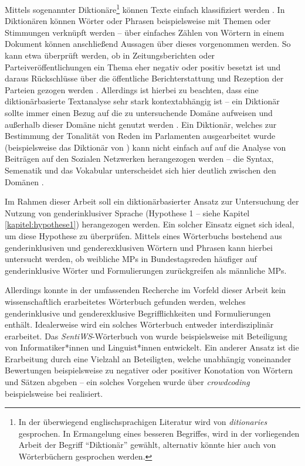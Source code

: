 \documentclass[12pt, 
    twoside=false, 
    bibliography=totoc, 
    numbers=endperiod, 
    headings=normal, 
    toc=chapterentrydotfill
    ]{scrbook}
\begin{document}
Mittels sogenannter Diktionäre\footnote{In der überwiegend englischsprachigen Literatur wird von \emph{ditionaries} gesprochen. In Ermangelung eines besseren Begriffes, wird in der vorliegenden Arbeit der Begriff \enquote{Diktionär} gewählt, alternativ könnte hier auch von Wörterbüchern gesprochen werden.} können Texte einfach klassifiziert werden \parencites[274]{grimmer_2013}[166]{brosius_2012}. In Diktionären können Wörter oder Phrasen beispielsweise mit Themen oder Stimmungen verknüpft werden -- über einfaches Zählen von Wörtern in einem Dokument können anschließend Aussagen über dieses vorgenommen werden.
So kann etwa überprüft werden, ob in Zeitungsberichten oder Parteiveröffentlichungen ein Thema eher negativ oder positiv besetzt ist und daraus Rückschlüsse über die öffentliche Berichterstattung und Rezeption der Parteien gezogen werden \parencites[vgl.][]{haselmayer_2017}[vgl.][]{backfried_2016}. Allerdings ist hierbei zu beachten, dass eine diktionärbasierte Textanalyse sehr stark kontextabhängig ist -- ein Diktionär sollte immer einen Bezug auf die zu untersuchende Domäne aufweisen und außerhalb dieser Domäne nicht genutzt werden \parencite[268]{grimmer_2013}. Ein Diktionär, welches zur Bestimmung der Tonalität von Reden im Parlamenten ausgearbeitet wurde (beispielsweise das Diktionär von \textcite{haselmayer_2017}) kann nicht einfach auf auf die Analyse von Beiträgen auf den Sozialen Netzwerken herangezogen werden -- die Syntax, Semenatik und das Vokabular unterscheidet sich hier deutlich zwischen den Domänen \parencite[vgl.][534f.]{wilkerson_2017}.

Im Rahmen dieser Arbeit soll ein diktionärbasierter Ansatz zur Untersuchung der Nutzung von genderinklusiver Sprache (Hypothese 1 -- siehe Kapitel \ref{kapitel:hypothese1}) herangezogen werden. Ein solcher Einsatz eignet sich ideal, um diese Hypothese zu überprüfen. Mittels eines Wörterbuchs bestehend aus genderinklusiven und genderexklusiven Wörtern und Phrasen kann hierbei untersucht werden, ob weibliche MPs in Bundestagsreden häufiger auf genderinklusive Wörter und Formulierungen zurückgreifen als männliche MPs.  

Allerdings konnte in der umfassenden Recherche im Vorfeld dieser Arbeit kein wissenschaftlich erarbeitetes Wörterbuch gefunden werden, welches genderinklusive und genderexklusive Begrifflichkeiten und Formulierungen enthält. Idealerweise wird ein solches Wörterbuch entweder interdisziplinär erarbeitet. Das \emph{SentiWS}-Wörterbuch von \textcite{remus_sentiws_2010} wurde beispielsweise mit Beteiligung von Informatiker*innen und Linguist*innen entwickelt. 
Ein anderer Ansatz ist die Erarbeitung durch eine Vielzahl an Beteiligten, welche unabhängig voneinander Bewertungen beispielsweise zu negativer oder positiver Konotation von Wörtern und Sätzen abgeben -- ein solches Vorgehen wurde über \emph{crowdcoding} beispielsweise bei \textcite{haselmayer_2017} realisiert.
\end{document}
